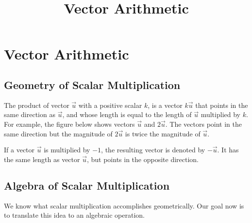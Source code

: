 \documentclass{ximera}
\title{Vector Arithmetic} \license{CC BY-NC-SA 4.0}
\begin{document}
\begin{abstract}
 
\end{abstract}
\maketitle

\section*{Vector Arithmetic}

\subsection*{Geometry of Scalar Multiplication} The product of vector $\vec{u}$ with a positive scalar $k$, is a vector $k\vec{u}$ that points in the same direction as $\vec{u}$, and whose length  is equal to the length of $\vec{u}$ multiplied by $k$. For example, the figure below shows vectors $\vec{u}$ and $2\vec{u}$.  The vectors point in the same direction but the magnitude of $2\vec{u}$ is twice the magnitude of $\vec{u}$.

\begin{center}
\end{center}


If a vector $\vec{u}$ is multiplied by $-1$, the resulting vector is denoted by $-\vec{u}$.  It has the same length as vector $\vec{u}$, but points in the opposite direction.

\begin{center}
\end{center}



\subsection*{Algebra of Scalar Multiplication}
We know what scalar multiplication accomplishes geometrically.  Our goal now is to translate this idea to an algebraic operation.  
\end{document}

